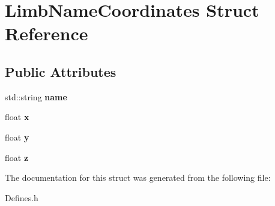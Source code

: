 \hypertarget{structLimbNameCoordinates}{
\section{LimbNameCoordinates Struct Reference}
\label{structLimbNameCoordinates}
}
\subsection*{Public Attributes}
\begin{DoxyCompactItemize}
\item 
\hypertarget{structLimbNameCoordinates_a485a7e27de43cff1c12cf34e7f8e5033}{
std::string {\bfseries name}}
\label{structLimbNameCoordinates_a485a7e27de43cff1c12cf34e7f8e5033}

\item 
\hypertarget{structLimbNameCoordinates_acf052aeed78d87bea08b99e384bcf82f}{
float {\bfseries x}}
\label{structLimbNameCoordinates_acf052aeed78d87bea08b99e384bcf82f}

\item 
\hypertarget{structLimbNameCoordinates_ab652230e4417a0d18dfd98c9598310d7}{
float {\bfseries y}}
\label{structLimbNameCoordinates_ab652230e4417a0d18dfd98c9598310d7}

\item 
\hypertarget{structLimbNameCoordinates_a849a8dde9955fee392bf73aa6d874765}{
float {\bfseries z}}
\label{structLimbNameCoordinates_a849a8dde9955fee392bf73aa6d874765}

\end{DoxyCompactItemize}


The documentation for this struct was generated from the following file:\begin{DoxyCompactItemize}
\item 
Defines.h\end{DoxyCompactItemize}
